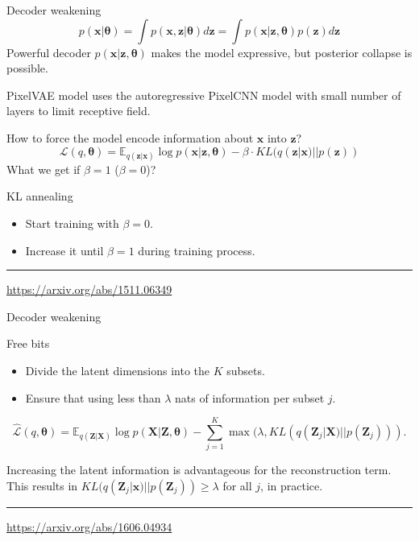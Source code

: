 \documentclass{beamer}
\newcommand{\bx}{\mathbf{x}}
\newcommand{\bz}{\mathbf{z}}
\newcommand{\bX}{\mathbf{X}}
\newcommand{\bZ}{\mathbf{Z}}
\newcommand{\btheta}{\boldsymbol{\theta}}
\begin{document}
\begin{frame}{Decoder weakening}
	\[
		p(\bx | \btheta) = \int p(\bx, \bz | \btheta) d \bz = \int p(\bx | \bz, \btheta) p(\bz) d \bz 
	\]
	Powerful decoder $p(\bx | \bz, \btheta)$ makes the model expressive, but posterior collapse is possible.
	
	PixelVAE model uses the autoregressive PixelCNN model with small number of layers to limit receptive field.
	
	How to force the model encode information about $\bx$ into $\bz$?
	\[
	    \mathcal{L}(q, \btheta) = \mathbb{E}_{q(\bz | \bx)} \log p(\bx | \bz, \btheta) - \beta \cdot KL (q(\bz | \bx) || p(\bz))
	\]
	What we get if $\beta = 1$ ($\beta = 0$)? \\
	
	\begin{block}{KL annealing}
		\begin{itemize}
		    \item Start training with $\beta = 0$.
		    \item Increase it until $\beta = 1$ during training process.
		\end{itemize}
	\end{block}
	\vfill
	\hrule\medskip
	{\scriptsize \href{https://arxiv.org/abs/1511.06349}{https://arxiv.org/abs/1511.06349}}
\end{frame}
\begin{frame}{Decoder weakening}
\begin{block}{Free bits}
\begin{itemize}
\item Divide the latent dimensions into the $K$ subsets.
\item Ensure that using less than $\lambda$ nats of information per subset $j$.
\end{itemize}

\[
    \hat{\mathcal{L}}(q, \btheta) = \mathbb{E}_{q(\bZ | \bX)} \log p(\bX | \bZ, \btheta) - \sum_{j=1}^K \max(\lambda, KL (q(\bZ_j | \bX) || p(\bZ_j))).
\]

Increasing the latent information is advantageous for the reconstruction term. \\
\vspace{0.2cm}
This results in $KL (q(\bZ_j | \bx) || p(\bZ_j)) \geq \lambda$ for all $j$, in practice.
\end{block}
\vspace{1cm}
\vfill
\hrule\medskip
{\scriptsize \href{https://arxiv.org/abs/1606.04934}{https://arxiv.org/abs/1606.04934}}
\end{frame}
\end{document}
